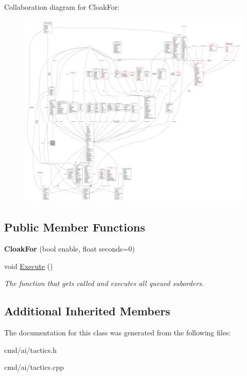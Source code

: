 Collaboration diagram for Cloak\+For\+:
\nopagebreak
\begin{figure}[H]
\begin{center}
\leavevmode
\includegraphics[width=350pt]{d7/d60/classCloakFor__coll__graph}
\end{center}
\end{figure}
\subsection*{Public Member Functions}
\begin{DoxyCompactItemize}
\item 
{\bfseries Cloak\+For} (bool enable, float seconds=0)\hypertarget{classCloakFor_aec23ea4f43ce720606bb72d23dd82d0e}{}\label{classCloakFor_aec23ea4f43ce720606bb72d23dd82d0e}

\item 
void \hyperlink{classCloakFor_a689dfb2d48d46a4accc88eefe0b9cda2}{Execute} ()\hypertarget{classCloakFor_a689dfb2d48d46a4accc88eefe0b9cda2}{}\label{classCloakFor_a689dfb2d48d46a4accc88eefe0b9cda2}

\begin{DoxyCompactList}\small\item\em The function that gets called and executes all queued suborders. \end{DoxyCompactList}\end{DoxyCompactItemize}
\subsection*{Additional Inherited Members}


The documentation for this class was generated from the following files\+:\begin{DoxyCompactItemize}
\item 
cmd/ai/tactics.\+h\item 
cmd/ai/tactics.\+cpp\end{DoxyCompactItemize}

